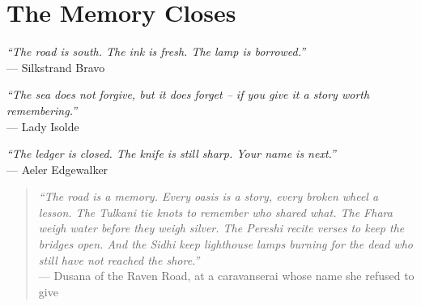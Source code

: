 \documentclass[12pt,oneside]{book}
\begin{document}


\chapter*{The Memory Closes}

\noindent
\textit{``The road is south. The ink is fresh. The lamp is borrowed.''} \\
\hfill --- Silkstrand Bravo

\vspace{0.5em}
\noindent
\textit{``The sea does not forgive, but it does forget -- if you give it a story worth remembering.''} \\
\hfill --- Lady Isolde

\vspace{0.5em}
\noindent
\textit{``The ledger is closed. The knife is still sharp. Your name is next.''} \\
\hfill --- Aeler Edgewalker

\vspace{2em}
\begin{quote}
  \small
  \textit{``The road is a memory. Every oasis is a story, every broken wheel a lesson. The Tulkani tie knots to remember who shared what. The Fhara weigh water before they weigh silver. The Pereshi recite verses to keep the bridges open. And the Sidhi keep lighthouse lamps burning for the dead who still have not reached the shore.''}
  \\ --- Dusana of the Raven Road, at a caravanserai whose name she refused to give
\end{quote}
\end{document}
